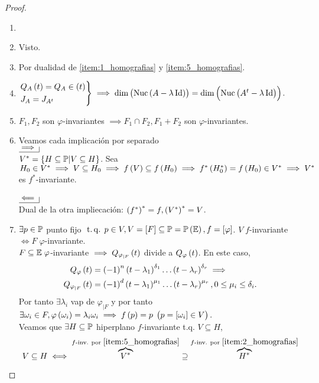 \begin{proof}
    \begin{enumerate}[(1)]
        \item[]
        \item Visto.
        \item Por dualidad de \eqref{item:1_homografias} y \eqref{item:5_homografias}.
        \item $\begin{rcases}
            Q_A\left( t\right) = Q_A\in\left( t\right)\\
            J_A = J_{A^t}
        \end{rcases}
        \implies \dim\left(\text{Nuc}\left( A-\lambda\operatorname{Id}\right)\right)=\dim\left(\text{Nuc}\left( A^t - \lambda\operatorname{Id}\right)\right)$.
        \item $F_1, F_2$ son $\varphi$-invariantes $\implies F_1 \cap F_2, F_1 + F_2$ son $\varphi$-invariantes.
        \item Veamos cada implicación por separado \\
        $\bimplies$ \\
        $V^* = \{ H\subseteq\mathbb{P} | V \subseteq H\}$. Sea $H_0\in V^* \implies V \subseteq H_0 \implies f\left( V\right)\subseteq f\left( H_0\right)\implies f^*\left( H_0^*\right) = f\left( H_0\right) \in V^*\implies V^*$ es $f^*$-invariante. \\ \\
        $\bimpliedby$ \\
        Dual de la otra impliecación: $\left( f^*\right)^* = f, \left( V^*\right)^*= V$.
        \item $\exists p\in\mathbb{P}$ punto fijo $\operatorname{\;t.q.\;} p \in V, V = [F] \subseteq\mathbb{P} = \mathbb{P}\left(\mathbb{E}\right), f=[\varphi]$. $V \; f$-invariante $\iff F\; \varphi$-invariante. \\
        $F \subseteq \mathbb{E}\; \varphi$-invariante $\implies Q_{\varphi_{|F}}\left( t\right)$ divide a $Q_\varphi\left( t \right)$. En este caso,
        \begin{align*}
            Q_\varphi\left( t\right) &= \left(-1\right)^n\left( t-\lambda_1\right)^{\delta_1} \dots \left( t-\lambda_r\right)^{\delta_r} \implies \\
            Q_{\varphi_{|F}}\left( t\right) &= \left(-1\right)^d\left( t-\lambda_1\right)^{\mu_1}\dots\left( t-\lambda_r\right)^{\mu_r}, 0\leq\mu_i\leq\delta_i.
        \end{align*}
        Por tanto $\exists \lambda_i$ vap de $\varphi_{|F}$ y por tanto $\exists \omega_i\in F, \varphi\left(\omega_i\right)=\lambda_i\omega_i \implies f\left( p\right)=p\;\left( p = [\omega_i]\in V\right).$ \\
        Veamos que $\exists H\subseteq \mathbb{P}$ hiperplano $f$-invariante t.q. $V\subseteq H$,
        \[
            V \subseteq H \iff \overbrace{V^*}^{f\text{-inv. por }\eqref{item:5_homografias}} \supseteq \overbrace{H^*}^{f\text{-inv. por }\eqref{item:2_homografias}}
        \]
    \end{enumerate}
\end{proof}
